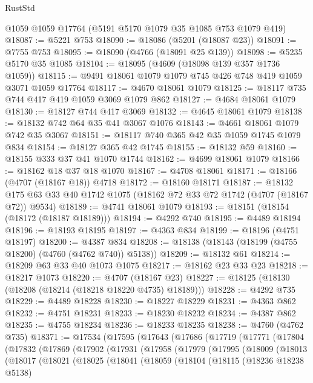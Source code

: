\begin{lexlean}{RustStd}
\begin{coremodule}
{\begin{coremodule}
{{{{{{{{{{{{{{{{{{{{{{{{{{{{{{{{{{{    @1059
    @1059
    @17764
    (@5191 @5170 @1079 @35 @1085 @753 @1079 @419)
@18087 := @5221 @753
@18090 := @18086 (@5201 (@18087 @23))
@18091 := @7755 @753
@18095 := @18090 (@4766 (@18091 @25 @139))
@18098 := @5235 @5170 @35 @1085
@18104 := @18095 (@4609 (@18098 @139 @357 @1736 @1059))
@18115 := @9491 @18061 @1079 @1079 @745 @426 @748 @419 @1059 @3071 @1059 @17764
@18117 := @4670 @18061 @1079
@18125 := @18117 @735 @744 @417 @419 @1059 @3069 @1079 @862
@18127 := @4684 @18061 @1079
@18130 := @18127 @744 @417 @3069
@18132 := @4645 @18061 @1079
@18138 := @18132 @742 @64 @35 @41 @3067 @1076
@18143 := @4661 @18061 @1079 @742 @35 @3067
@18151 := @18117 @740 @365 @42 @35 @1059 @1745 @1079 @834
@18154 := @18127 @365 @42 @1745
@18155 := @18132 @59
@18160 := @18155 @333 @37 @41 @1070 @1744
@18162 := @4699 @18061 @1079
@18166 := @18162 @18 @37 @18 @1070
@18167 := @4708 @18061
@18171 := @18166 (@4707 (@18167 @18)) @4718
@18172 := @18160 @18171
@18187 := @18132 @175 @63 @33 @40 @1742 @1075 (@18162 @72 @33 @72 @1742 (@4707 (@18167 @72)) @9534)
@18189 := @4741 @18061 @1079
@18193 := @18151 (@18154 (@18172 (@18187 @18189)))
@18194 := @4292 @740
@18195 := @4489 @18194
@18196 := @18193 @18195
@18197 := @4363 @834
@18199 := @18196 (@4751 @18197)
@18200 := @4387 @834
@18208 := @18138 (@18143 (@18199 (@4755 @18200) (@4760 (@4762 @740)) @5138))
@18209 := @18132 @61
@18214 := @18209 @63 @33 @40 @1073 @1075
@18217 := @18162 @23 @33 @23
@18218 := @18217 @1073
@18220 := @4707 (@18167 @23)
@18227 := @18125 (@18130 (@18208 (@18214 (@18218 @18220 @4735) @18189)))
@18228 := @4292 @735
@18229 := @4489 @18228
@18230 := @18227 @18229
@18231 := @4363 @862
@18232 := @4751 @18231
@18233 := @18230 @18232
@18234 := @4387 @862
@18235 := @4755 @18234
@18236 := @18233 @18235
@18238 := @4760 (@4762 @735)
@18371 := @17534
    (@17595
      (@17643
        (@17686
          (@17719
            (@17771
              (@17804
                (@17832
                  (@17869
                    (@17902
                      (@17931
                        (@17958
                          (@17979
                            (@17995
                              (@18009
                                (@18013
                                  (@18017
                                    (@18021
                                      (@18025
                                        (@18041
                                          (@18059
                                            (@18104
                                              (@18115
                                                (@18236 @18238 @5138)
}}}}}}}}}}}}}}}}}}}}}}}}}}}}}}}}}}}
\end{coremodule}}
\end{coremodule}
\end{lexlean}
